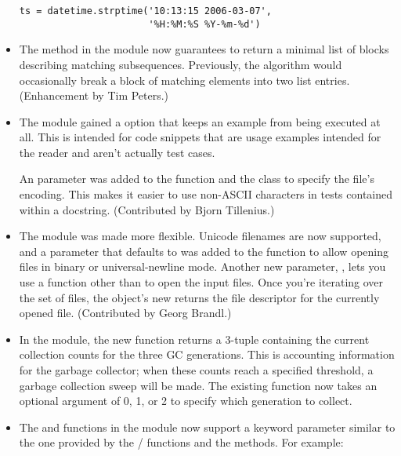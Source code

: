 \documentclass{howto}
\begin{document}
\begin{itemize}
\begin{verbatim}
ts = datetime.strptime('10:13:15 2006-03-07',
                       '%H:%M:%S %Y-%m-%d')
\end{verbatim}

\item The  method
in the  module now guarantees to return a minimal list
of blocks describing matching subsequences.  Previously, the algorithm would
occasionally break a block of matching elements into two list entries.
(Enhancement by Tim Peters.)

\item The  module gained a  option that
keeps an example from being executed at all.  This is intended for
code snippets that are usage examples intended for the reader and
aren't actually test cases.

An  parameter was added to the 
function and the  class to specify the file's
encoding.  This makes it easier to use non-ASCII characters in 
tests contained within a docstring.  (Contributed by Bjorn Tillenius.)

\item The  module was made more flexible.
Unicode filenames are now supported, and a  parameter that
defaults to  was added to the
 function to allow opening files in binary or
universal-newline mode.  Another new parameter, ,
lets you use a function other than  
to open the input files.  Once you're iterating over 
the set of files, the  object's new
 returns the file descriptor for the currently opened file.
(Contributed by Georg Brandl.)

\item In the  module, the new  function
returns a 3-tuple containing the current collection counts for the
three GC generations.  This is accounting information for the garbage
collector; when these counts reach a specified threshold, a garbage
collection sweep will be made.  The existing 
function now takes an optional  argument of 0, 1, or 2
to specify which generation to collect.

\item The  and 
 functions in the  module 
now support a  keyword parameter similar to the one
provided by the / functions
and the  methods.  For example:


\end{itemize}
\end{document}
